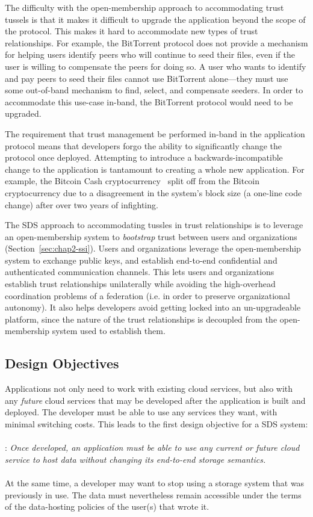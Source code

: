 The difficulty with the open-membership approach to accommodating trust tussels is that
it makes it difficult to upgrade the application beyond the scope of the
protocol.  This makes it hard to accommodate new types of trust relationships.
For example, the BitTorrent protocol does not provide a mechanism for helping
users identify peers who will continue to seed their files, even if the user is
willing to compensate the peers for doing so.  A user who wants to identify
and pay peers to seed their files cannot use BitTorrent alone---they must use
some out-of-band mechanism to find, select, and compensate seeders.  In order to
accommodate this use-case in-band, the BitTorrent protocol would need to be
upgraded.

The requirement that trust management be performed in-band in the application
protocol means that developers forgo the ability to significantly change the
protocol once deployed.  Attempting to introduce a backwards-incompatible change to the
application is tantamount to creating a whole new application.  For example,
the Bitcoin Cash cryptocurrency~\cite{bcash} split off from the Bitcoin
cryptocurrency due to a disagreement in the system's block size (a one-line code
change) after over two years of infighting.

The SDS approach to accommodating tussles in trust relationships is to leverage
an open-membership system to \emph{bootstrap} trust between
users and organizations (Section~\ref{sec:chap2-ssi}).  Users and
organizations leverage the open-membership system to exchange public keys, and
establish end-to-end confidential and authenticated communication channels.
This lets users and organizations establish trust relationships unilaterally while
avoiding the high-overhead coordination problems of a
federation (i.e. in order to preserve organizational autonomy).
It also helps developers avoid getting locked into an un-upgradeable platform,
since the nature of the trust relationships is decoupled from the
open-membership system used to establish them.

\subsection{Design Objectives}

Applications not only need to work with existing cloud services, but also with
any \emph{future} cloud services that may be developed after the application is
built and deployed.  The developer must be able to use any services they want,
with minimal switching costs.  This leads to the first design objective for a SDS
system:
\\
\\
: \emph{Once developed, an application must be
able to use any current or future 
cloud service to host data without changing its end-to-end storage semantics.}
\\
\\
At the same time, a developer may want to stop using a storage system that was
previously in use.  The data must nevertheless remain accessible under the
terms of the data-hosting policies of the user(s) that wrote it.

